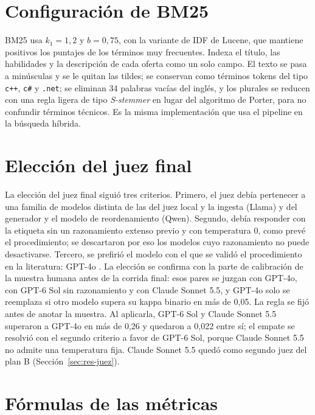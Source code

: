 \section{Configuración de BM25}
\label{anx:bm25}

BM25 \citep{Robertson2009} usa $k_1 = 1{,}2$ y $b = 0{,}75$, con la variante de IDF de Lucene, que mantiene positivos los puntajes de los términos muy frecuentes. Indexa el título, las habilidades y la descripción de cada oferta como un solo campo. El texto se pasa a minúsculas y se le quitan las tildes; se conservan como términos tokens del tipo \texttt{c++}, \texttt{c\#} y \texttt{.net}; se eliminan 34 palabras vacías del inglés, y los plurales se reducen con una regla ligera de tipo \textit{S-stemmer} en lugar del algoritmo de Porter, para no confundir términos técnicos. Es la misma implementación que usa el pipeline en la búsqueda híbrida.

\section{Elección del juez final}
\label{anx:juez-final}

La elección del juez final siguió tres criterios. Primero, el juez debía pertenecer a una familia de modelos distinta de las del juez local y la ingesta (Llama) y del generador y el modelo de reordenamiento (Qwen). Segundo, debía responder con la etiqueta sin un razonamiento extenso previo y con temperatura 0, como prevé el procedimiento; se descartaron por eso los modelos cuyo razonamiento no puede desactivarse. Tercero, se prefirió el modelo con el que se validó el procedimiento en la literatura: GPT-4o \citep{Upadhyay2024}. La elección se confirma con la parte de calibración de la muestra humana antes de la corrida final: esos pares se juzgan con GPT-4o, con GPT-6 Sol sin razonamiento y con Claude Sonnet 5.5, y GPT-4o solo se reemplaza si otro modelo supera su kappa binario en más de 0,05. La regla se fijó antes de anotar la muestra. Al aplicarla, GPT-6 Sol y Claude Sonnet 5.5 superaron a GPT-4o en más de 0,26 y quedaron a 0,022 entre sí; el empate se resolvió con el segundo criterio a favor de GPT-6 Sol, porque Claude Sonnet 5.5 no admite una temperatura fija. Claude Sonnet 5.5 quedó como segundo juez del plan B (Sección~\ref{sec:res-juez}).

\section{Fórmulas de las métricas}
\label{anx:formulas}

